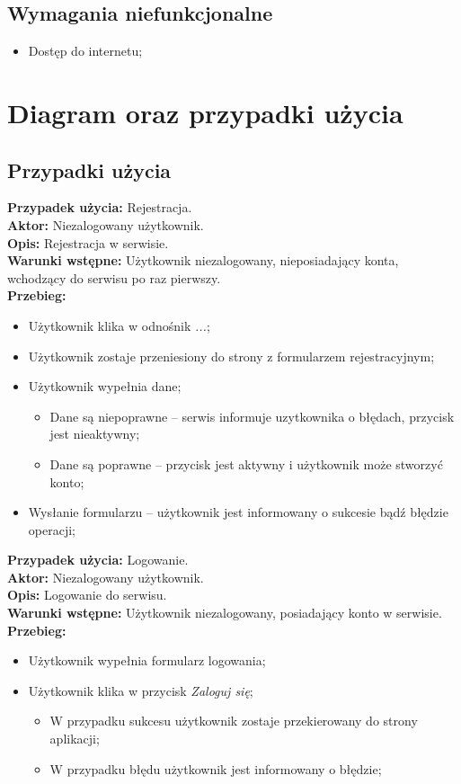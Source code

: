 \subsection{Wymagania niefunkcjonalne}
\begin{itemize}
    \item Dostęp do internetu;
\end{itemize}
\section{Diagram oraz przypadki użycia}

\subsection{Przypadki użycia}

\noindent
\textbf{Przypadek użycia:} Rejestracja. \\
\textbf{Aktor:} Niezalogowany użytkownik. \\
\textbf{Opis:} Rejestracja w serwisie. \\
\textbf{Warunki wstępne:} Użytkownik niezalogowany, nieposiadający konta, wchodzący do serwisu po raz pierwszy.\\
\textbf{Przebieg:}
\begin{itemize}[leftmargin=1cm]
    \item Użytkownik klika w odnośnik \textit{...};
    \item Użytkownik zostaje przeniesiony do strony z formularzem rejestracyjnym;
    \item  Użytkownik wypełnia dane;
    \begin{itemize}
        \item Dane są niepoprawne -- serwis informuje uzytkownika o błędach, przycisk jest nieaktywny;
        \item Dane są poprawne -- przycisk jest aktywny i użytkownik może stworzyć konto;
    \end{itemize}
    \item Wysłanie formularzu -- użytkownik jest informowany o sukcesie bądź błędzie operacji;
\end{itemize}

\textbf{Przypadek użycia:} Logowanie. \\
\textbf{Aktor:} Niezalogowany użytkownik. \\
\textbf{Opis:} Logowanie do serwisu. \\
\textbf{Warunki wstępne:} Użytkownik niezalogowany, posiadający konto w serwisie. \\
\textbf{Przebieg:}
\begin{itemize}[leftmargin=1cm]
    \item Użytkownik wypełnia formularz logowania;
    \item Użytkownik klika w przycisk \textit{Zaloguj się};
    \begin{itemize}
        \item W przypadku sukcesu użytkownik zostaje przekierowany do strony aplikacji;
        \item W przypadku błędu użytkownik jest informowany o błędzie;
    \end{itemize}
\end{itemize}

